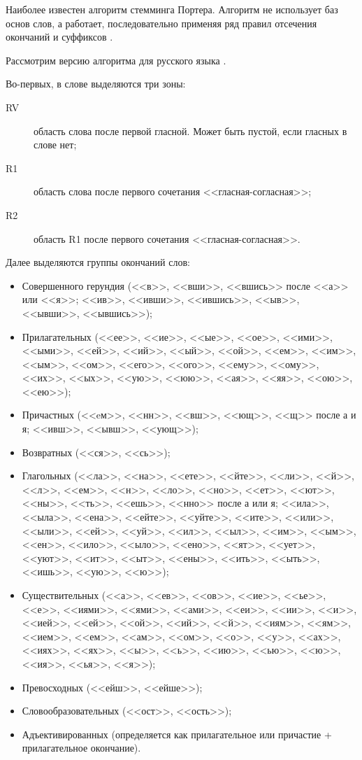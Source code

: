 Наиболее известен алгоритм стемминга Портера. Алгоритм не использует баз основ слов, а работает, последовательно применяя ряд правил отсечения окончаний и суффиксов \cite{porter97}.

Рассмотрим версию алгоритма для русского языка \cite{porter06}.

Во-первых, в слове выделяются три зоны:
\begin{description}
  \item[RV] область слова после первой гласной. Может быть пустой, если гласных в слове нет;
  \item[R1] область слова после первого сочетания <<гласная-согласная>>;
  \item[R2] область R1 после первого сочетания <<гласная-согласная>>.
\end{description}

Далее выделяются группы окончаний слов:
\begin{itemize}
  \item Совершенного герундия (<<в>>, <<вши>>, <<вшись>> после <<а>> или <<я>>; <<ив>>, <<ивши>>, <<ившись>>, <<ыв>>, <<ывши>>, <<ывшись>>);
  \item Прилагательных (<<ее>>, <<ие>>, <<ые>>, <<ое>>, <<ими>>, <<ыми>>, <<ей>>, <<ий>>, <<ый>>, <<ой>>, <<ем>>, <<им>>, <<ым>>, <<ом>>, <<его>>, <<ого>>, <<ему>>, <<ому>>, <<их>>, <<ых>>, <<ую>>, <<юю>>, <<ая>>, <<яя>>, <<ою>>, <<ею>>);
  \item Причастных (<<eм>>, <<нн>>, <<вш>>, <<ющ>>, <<щ>> после а и я; <<ивш>>, <<ывш>>, <<ующ>>);
  \item Возвратных (<<ся>>, <<сь>>);
  \item Глагольных (<<ла>>, <<на>>, <<ете>>, <<йте>>, <<ли>>, <<й>>, <<л>>, <<ем>>, <<н>>, <<ло>>, <<но>>, <<ет>>, <<ют>>, <<ны>>, <<ть>>, <<ешь>>, <<нно>> после а или я; <<ила>>, <<ыла>>, <<ена>>, <<ейте>>, <<уйте>>, <<ите>>, <<или>>, <<ыли>>, <<ей>>, <<уй>>, <<ил>>, <<ыл>>, <<им>>, <<ым>>, <<ен>>, <<ило>>, <<ыло>>, <<ено>>, <<ят>>, <<ует>>, <<уют>>, <<ит>>, <<ыт>>, <<ены>>, <<ить>>, <<ыть>>, <<ишь>>, <<ую>>, <<ю>>);
  \item Существительных (<<а>>, <<ев>>, <<ов>>, <<ие>>, <<ье>>, <<е>>, <<иями>>, <<ями>>, <<ами>>, <<еи>>, <<ии>>, <<и>>, <<ией>>, <<ей>>, <<ой>>, <<ий>>, <<й>>, <<иям>>, <<ям>>, <<ием>>, <<ем>>, <<ам>>, <<ом>>, <<о>>, <<у>>, <<ах>>, <<иях>>, <<ях>>, <<ы>>, <<ь>>, <<ию>>, <<ью>>, <<ю>>, <<ия>>, <<ья>>, <<я>>);
  \item Превосходных (<<ейш>>, <<ейше>>);
  \item Словообразовательных (<<ост>>, <<ость>>);
  \item Адъективированных (определяется как прилагательное или причастие + прилагательное окончание).
\end{itemize}

